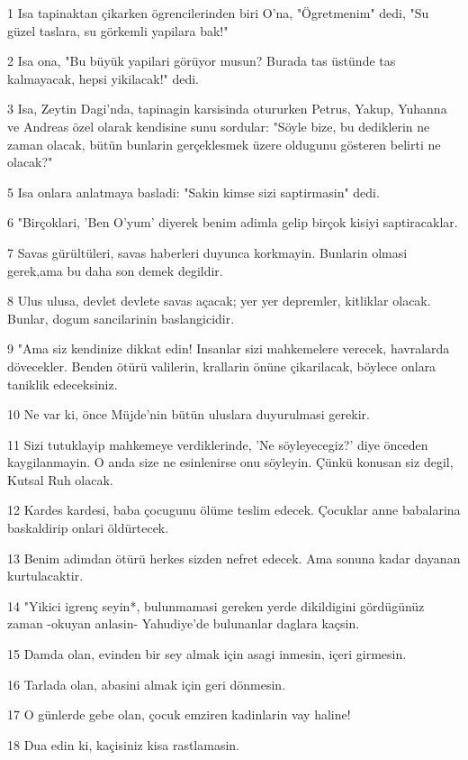 \par 1 Isa tapinaktan çikarken ögrencilerinden biri O'na, "Ögretmenim" dedi, "Su güzel taslara, su görkemli yapilara bak!"
\par 2 Isa ona, "Bu büyük yapilari görüyor musun? Burada tas üstünde tas kalmayacak, hepsi yikilacak!" dedi.
\par 3 Isa, Zeytin Dagi'nda, tapinagin karsisinda otururken Petrus, Yakup, Yuhanna ve Andreas özel olarak kendisine sunu sordular: "Söyle bize, bu dediklerin ne zaman olacak, bütün bunlarin gerçeklesmek üzere oldugunu gösteren belirti ne olacak?"
\par 5 Isa onlara anlatmaya basladi: "Sakin kimse sizi saptirmasin" dedi.
\par 6 "Birçoklari, 'Ben O'yum' diyerek benim adimla gelip birçok kisiyi saptiracaklar.
\par 7 Savas gürültüleri, savas haberleri duyunca korkmayin. Bunlarin olmasi gerek,ama bu daha son demek degildir.
\par 8 Ulus ulusa, devlet devlete savas açacak; yer yer depremler, kitliklar olacak. Bunlar, dogum sancilarinin baslangicidir.
\par 9 "Ama siz kendinize dikkat edin! Insanlar sizi mahkemelere verecek, havralarda dövecekler. Benden ötürü valilerin, krallarin önüne çikarilacak, böylece onlara taniklik edeceksiniz.
\par 10 Ne var ki, önce Müjde'nin bütün uluslara duyurulmasi gerekir.
\par 11 Sizi tutuklayip mahkemeye verdiklerinde, 'Ne söyleyecegiz?' diye önceden kaygilanmayin. O anda size ne esinlenirse onu söyleyin. Çünkü konusan siz degil, Kutsal Ruh olacak.
\par 12 Kardes kardesi, baba çocugunu ölüme teslim edecek. Çocuklar anne babalarina baskaldirip onlari öldürtecek.
\par 13 Benim adimdan ötürü herkes sizden nefret edecek. Ama sonuna kadar dayanan kurtulacaktir.
\par 14 "Yikici igrenç seyin*, bulunmamasi gereken yerde dikildigini gördügünüz zaman -okuyan anlasin- Yahudiye'de bulunanlar daglara kaçsin.
\par 15 Damda olan, evinden bir sey almak için asagi inmesin, içeri girmesin.
\par 16 Tarlada olan, abasini almak için geri dönmesin.
\par 17 O günlerde gebe olan, çocuk emziren kadinlarin vay haline!
\par 18 Dua edin ki, kaçisiniz kisa rastlamasin.
